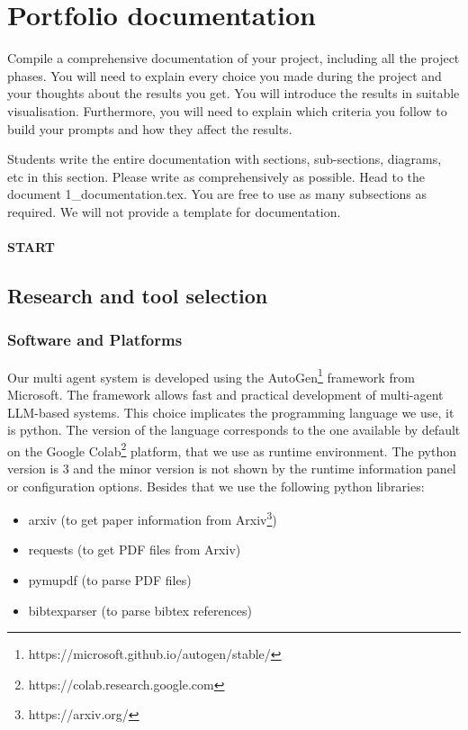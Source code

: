 \setcounter{page}{1}
\section{Portfolio documentation}
\label{sec:documentation}

Compile a comprehensive documentation of your project, including all the project phases. You will need to explain every choice you made during the project and your thoughts about the results you get. You will introduce the results in suitable visualisation. Furthermore, you will need to explain which criteria you follow to build your prompts and how they affect the results. 

Students write the entire documentation with sections, sub-sections, diagrams, etc in this section. Please write as comprehensively as possible. Head to the document 1\_documentation.tex. You are free to use as many subsections as required. We will not provide a template for documentation. 




\paragraph{START}

\subsection{Research and tool selection}

\subsubsection{Software and Platforms}
\label{choice:software}

Our multi agent system is developed using the AutoGen\footnote{https://microsoft.github.io/autogen/stable/} framework from Microsoft. The framework allows fast and practical development of multi-agent LLM-based systems. This choice implicates the programming language we use, it is python. The version of the language corresponds to the one available by default on the Google Colab\footnote{https://colab.research.google.com} platform, that we use as runtime environment. The python version is 3 and the minor version is not shown by the runtime information panel or configuration options. Besides that we use the following python libraries:

\begin{itemize}
	\item arxiv (to get paper information from Arxiv\footnote{https://arxiv.org/})
	\item requests (to get PDF files from Arxiv)
	\item pymupdf (to parse PDF files)
	\item bibtexparser (to parse bibtex references)
\end{itemize}

